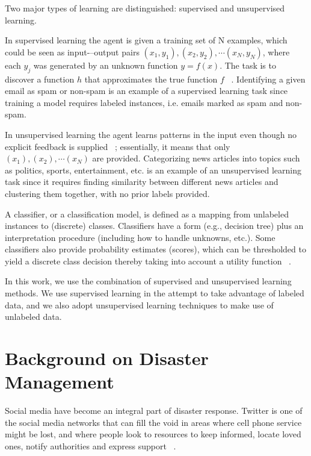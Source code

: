 Two major types of learning are distinguished: supervised and unsupervised learning.

In supervised learning the agent is given a training set of N examples, which could be seen as input-–output pairs $(x_1, y_1), (x_2, y_2), \cdots(x_N, y_N)$, where each $y_j$ was generated by an unknown function $y = f(x)$. The task is to discover a function $h$ that approximates the true function $f$ ~\citep{rn}. Identifying a given email as spam or non-spam is an example of a supervised learning task since training a model requires labeled instances, i.e. emails marked as spam and non-spam. 

In unsupervised learning the agent learns patterns in the input even though no explicit feedback is supplied ~\citep{rn}; essentially, it means that only $(x_1), (x_2), \cdots(x_N)$ are provided. Categorizing news articles into topics such as politics, sports, entertainment, etc. is an example of an unsupervised learning task since it requires finding similarity between different news articles and clustering them together, with no prior labels provided. 

A classifier, or a classification model, is defined as a mapping from unlabeled instances to (discrete) classes. Classifiers have a form (e.g., decision tree) plus an interpretation procedure (including how to handle unknowns, etc.). Some classifiers also provide probability estimates (scores), which can be thresholded to yield a discrete class decision thereby taking into account a utility function ~\citep{terms}. 

In this work, we use the combination of supervised and unsupervised learning methods. We use supervised learning in the attempt to take advantage of labeled data, and we also adopt unsupervised learning techniques to make use of unlabeled data. 


\section{Background on Disaster Management}
\label{backgrounddisaster}

Social media have become an integral part of disaster response. Twitter is one of the social media networks that can fill the void in areas where cell phone service might be lost, and where people look to resources to keep informed, locate loved ones, notify authorities and express support ~\citep{scientificamer}.

